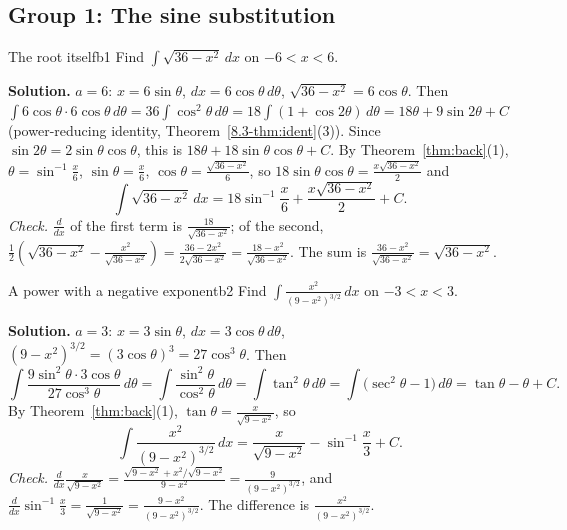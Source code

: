 \documentclass[11pt]{article}
\begin{document}
\subsection*{Group 1: The sine substitution}

\begin{exmp}{The root itself}{b1}
Find $\int\sqrt{36-x^2}\,dx$ on $-6<x<6$.

\textbf{Solution.} $a=6$: $x=6\sin\theta$, $dx=6\cos\theta\,d\theta$, $\sqrt{36-x^2}=6\cos\theta$. Then $\int6\cos\theta\cdot6\cos\theta\,d\theta=36\int\cos^2\theta\,d\theta=18\int(1+\cos2\theta)\,d\theta=18\theta+9\sin2\theta+C$ (power-reducing identity, Theorem~\ref{8.3-thm:ident}(3)). Since $\sin2\theta=2\sin\theta\cos\theta$, this is $18\theta+18\sin\theta\cos\theta+C$. By Theorem~\ref{thm:back}(1), $\theta=\sin^{-1}\frac x6$, $\sin\theta=\frac x6$, $\cos\theta=\frac{\sqrt{36-x^2}}6$, so $18\sin\theta\cos\theta=\frac{x\sqrt{36-x^2}}2$ and
\[\int\sqrt{36-x^2}\,dx=18\sin^{-1}\frac x6+\frac{x\sqrt{36-x^2}}2+C .\]
\emph{Check.} $\frac{d}{dx}$ of the first term is $\frac{18}{\sqrt{36-x^2}}$; of the second, $\frac12\left(\sqrt{36-x^2}-\frac{x^2}{\sqrt{36-x^2}}\right)=\frac{36-2x^2}{2\sqrt{36-x^2}}=\frac{18-x^2}{\sqrt{36-x^2}}$. The sum is $\frac{36-x^2}{\sqrt{36-x^2}}=\sqrt{36-x^2}$.
\end{exmp}

\begin{exmp}{A power with a negative exponent}{b2}
Find $\int\frac{x^2}{(9-x^2)^{3/2}}\,dx$ on $-3<x<3$.

\textbf{Solution.} $a=3$: $x=3\sin\theta$, $dx=3\cos\theta\,d\theta$, $(9-x^2)^{3/2}=(3\cos\theta)^3=27\cos^3\theta$. Then
\[\int\frac{9\sin^2\theta\cdot3\cos\theta}{27\cos^3\theta}\,d\theta=\int\frac{\sin^2\theta}{\cos^2\theta}\,d\theta=\int\tan^2\theta\,d\theta=\int\big(\sec^2\theta-1\big)\,d\theta=\tan\theta-\theta+C .\]
By Theorem~\ref{thm:back}(1), $\tan\theta=\frac x{\sqrt{9-x^2}}$, so
\[\int\frac{x^2}{(9-x^2)^{3/2}}\,dx=\frac x{\sqrt{9-x^2}}-\sin^{-1}\frac x3+C .\]
\emph{Check.} $\frac{d}{dx}\frac x{\sqrt{9-x^2}}=\frac{\sqrt{9-x^2}+x^2/\sqrt{9-x^2}}{9-x^2}=\frac9{(9-x^2)^{3/2}}$, and $\frac{d}{dx}\sin^{-1}\frac x3=\frac1{\sqrt{9-x^2}}=\frac{9-x^2}{(9-x^2)^{3/2}}$. The difference is $\frac{x^2}{(9-x^2)^{3/2}}$.
\end{exmp}
\end{document}
